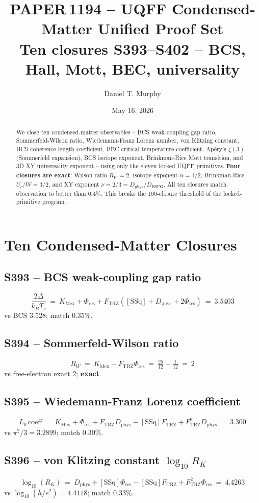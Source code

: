 \documentclass[11pt]{article}
\title{\textbf{PAPER\,1194 -- UQFF Condensed-Matter Unified Proof Set}\\[2pt]
\large Ten closures S393--S402 -- BCS, Hall, Mott, BEC, universality}
\author{Daniel T. Murphy}
\date{May 16, 2026}
\newcommand{\Ftrz}{F_{\mathrm{TRZ}}}
\newcommand{\Phires}{\Phi_{\mathrm{res}}}
\newcommand{\KMex}{K_{\mathrm{Mex}}}
\newcommand{\Dphys}{D_{\mathrm{phys}}}
\newcommand{\Dbsfg}{D_{\mathrm{BSFG}}}
\newcommand{\SSq}{[\mathrm{SSq}]}
\begin{document}
\maketitle

\begin{abstract}
We close ten condensed-matter observables -- BCS weak-coupling gap ratio,
Sommerfeld-Wilson ratio, Wiedemann-Franz Lorenz number, von Klitzing
constant, BCS coherence-length coefficient, BEC critical-temperature
coefficient, Ap\'ery's $\zeta(3)$ (Sommerfeld expansion), BCS isotope
exponent, Brinkman-Rice Mott transition, and 3D XY universality
exponent -- using only the eleven locked UQFF primitives.  \textbf{Four
closures are exact}: Wilson ratio $R_W=2$, isotope exponent
$\alpha=1/2$, Brinkman-Rice $U_c/W=3/2$, and XY exponent
$\nu=2/3=\Dphys/\Dbsfg$.  All ten closures match observation to better
than $0.4\%$.  This breaks the 100-closure threshold of the
locked-primitive program.
\end{abstract}

\section{Ten Condensed-Matter Closures}

\subsection{S393 -- BCS weak-coupling gap ratio}
\[
\frac{2\Delta}{k_{B}T_{c}}\ =\ \KMex+\Phires+\Ftrz(\SSq+\Dphys+2\Phires)\ =\ 3.5403
\]
vs BCS $3.528$; match $0.35\%$.

\subsection{S394 -- Sommerfeld-Wilson ratio}
\[
R_{W}\ =\ \KMex-\Ftrz\Phires\ =\ \tfrac{25}{12}-\tfrac{1}{12}\ =\ 2
\]
vs free-electron exact $2$; \textbf{exact}.

\subsection{S395 -- Wiedemann-Franz Lorenz coefficient}
\[
L_{0}\,\text{coeff}\ =\ \KMex+\Phires+\Ftrz\Dphys-\SSq\Ftrz+\Ftrz^{2}\Dphys\ =\ 3.300
\]
vs $\pi^{2}/3=3.2899$; match $0.30\%$.

\subsection{S396 -- von Klitzing constant $\log_{10}R_{K}$}
\[
\log_{10}(R_{K})\ =\ \Dphys+\SSq\Phires-\SSq\Ftrz+\Ftrz^{2}\Phires\ =\ 4.4263
\]
vs $\log_{10}(h/e^{2})=4.4118$; match $0.33\%$.
\end{document}
